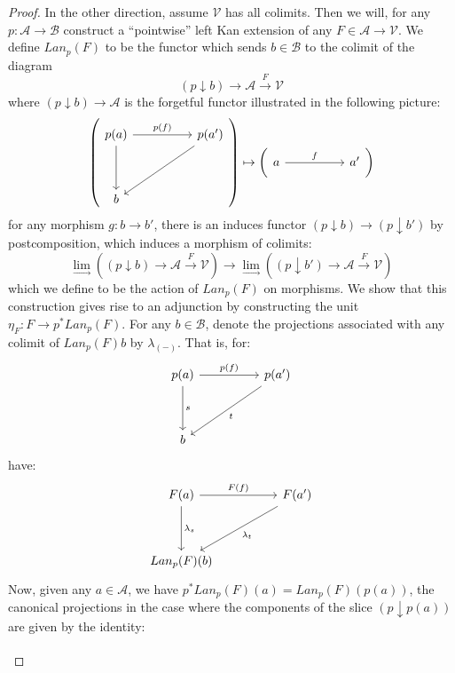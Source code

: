 \documentclass[a4paper,english]{lipics-v2018}
\begin{document}
\begin{theorem}
\begin{proof}
      In the other direction, assume $\mathcal{V}$ has all colimits. Then we will, for any $p : \mathcal{A} \to \mathcal{B}$ construct a ``pointwise'' left Kan extension of any $F \in \mathcal{A} \to \mathcal{V}$. We define $Lan_p(F)$ to be the functor which sends $b \in \mathcal{B}$ to the colimit of the diagram
      \[
        (p \downarrow b) \to \mathcal{A} \xrightarrow{F} \mathcal{V}
      \]
      where $(p \downarrow b) \to \mathcal{A}$ is the forgetful functor illustrated in the following picture:
      \[
        \left (
        \begin{tikzcd}[row sep=huge, column sep=huge]
        p(a) \ar[d] \ar[r, "p(f)"] & p(a')  \ar[ld] \\
        b
        \end{tikzcd}
      \right ) \mapsto \left(
      \begin{tikzcd}[row sep=huge, column sep=huge]
        a \ar[r, "f"] & a'
        \end{tikzcd}
        \right )
      \]
      for any morphism $g : b \to b'$, there is an induces functor $(p \downarrow b) \to (p \downarrow b')$ by postcomposition, which induces a morphism of colimits:
      \[
        \lim_\to\left ((p \downarrow b) \to \mathcal{A} \xrightarrow{F} \mathcal{V} \right ) \to \lim_\to \left ((p \downarrow b') \to \mathcal{A} \xrightarrow{F} \mathcal{V} \right )
      \]
      which we define to be the action of $Lan_p(F)$ on morphisms. We show that this construction gives rise to an adjunction by constructing the unit $\eta_F : F \to p^*Lan_p(F)$. For any $b \in \mathcal{B}$, denote the projections associated with any colimit of $Lan_p(F)b$ by $\lambda_{(-)}$. That is, for:
      \[
        \begin{tikzcd}[row sep=huge, column sep=huge]
        p(a) \ar[d, "s"] \ar[r, "p(f)"] & p(a')  \ar[ld, "t"] \\
        b
        \end{tikzcd}
      \]
      have:
      \[
        \begin{tikzcd}[row sep=huge, column sep=huge]
        F(a) \ar[d, "\lambda_s"] \ar[r, "F(f)"] & F(a') \ar[dl, "\lambda_t"] \\
        Lan_p(F)(b)
        \end{tikzcd}
      \]
      Now, given any $a \in \mathcal{A}$, we have $p^*Lan_p(F)(a) = Lan_p(F)(p(a))$, the canonical projections in the case where the components of the slice $(p \downarrow p(a))$ are given by the identity:
      \[
        \begin{tikzcd}[row sep=huge, column sep=huge]

\end{tikzcd}\]
\end{proof}
\end{theorem}
\end{document}
